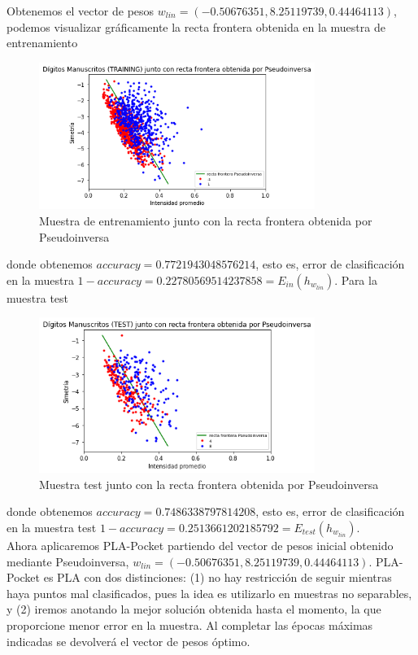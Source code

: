 \documentclass[11pt,a4paper]{article}
\theoremstyle{definition}
\begin{document}
	Obtenemos el vector de pesos $w_{lin}=(-0.50676351,8.25119739, 0.44464113)$, podemos visualizar gráficamente la recta frontera obtenida en la muestra de entrenamiento
	\begin{figure}[H]
		\centering
		\includegraphics[width=0.8\textwidth]{images/bonus2}
		\caption{Muestra de entrenamiento junto con la recta frontera obtenida por Pseudoinversa}
	\end{figure}
	donde obtenemos $accuracy = 0.7721943048576214$, esto es, error de clasificación en la muestra $1-accuracy=0.22780569514237858=E_{in}(h_{w_{lin}})$. Para la muestra test
	\begin{figure}[H]
		\centering
		\includegraphics[width=0.8\textwidth]{images/bonus3}
		\caption{Muestra test junto con la recta frontera obtenida por Pseudoinversa}
	\end{figure}
	donde obtenemos $accuracy = 0.7486338797814208$, esto es, error de clasificación en la muestra test $1-accuracy=0.2513661202185792=E_{test}(h_{w_{lin}})$.\\
	
	Ahora aplicaremos PLA-Pocket partiendo del vector de pesos inicial obtenido mediante Pseudoinversa, $w_{lin}=(-0.50676351,8.25119739, 0.44464113)$. PLA-Pocket es PLA con dos distinciones: (1) no hay restricción de seguir mientras haya puntos mal clasificados, pues la idea es utilizarlo en muestras no separables, y (2) iremos anotando la mejor solución obtenida hasta el momento, la que proporcione menor error en la muestra. Al completar las épocas máximas indicadas se devolverá el vector de pesos óptimo.
	
\end{document}

